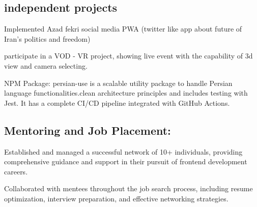 \subsection{{independent projects }}

\begin{zitemize}

             \item{
                Implemented Azad fekri social media PWA (twitter like app about future of Iran's politics and freedom)}
             \item{
                participate in a VOD - VR project, showing live event with the capability of 3d view and camera selecting.
                }

                             \item{
               NPM Package: persian-use is a scalable utility package to handle Persian language functionalities.clean architecture principles and includes testing with Jest. It has a complete CI/CD pipeline integrated with GitHub Actions.
                }


\end{zitemize}
\subsection{{Mentoring and Job Placement:
 }}

\begin{zitemize}

             \item{
               Established and managed a successful network of 10+ individuals, providing comprehensive guidance and support in their pursuit of frontend development careers.}

             \item{
               Collaborated with mentees throughout the job search process, including resume optimization, interview preparation, and effective networking strategies.}



\end{zitemize}
